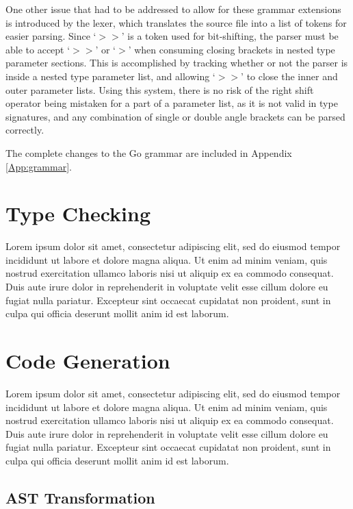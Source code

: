 \documentclass[letterpaper,twocolumn,10pt]{article}
\begin{document}
One other issue that had to be addressed to allow for these grammar extensions is introduced by the lexer, which translates the source file into a list of tokens for easier parsing. Since `\textbf{$>>$}' is a token used for bit-shifting, the parser must be able to accept `\textbf{$>>$}' or  `\textbf{$>$}' when consuming closing brackets in nested type parameter sections. This is accomplished by tracking whether or not the parser is inside a nested type parameter list, and allowing  `\textbf{$>>$}' to close the inner and outer parameter lists. Using this system, there is no risk of the right shift operator being mistaken for a part of a parameter list, as it is not valid in type signatures, and any combination of single or double angle brackets can be parsed correctly.

The complete changes to the Go grammar are included in Appendix \ref{App:grammar}.

\section{Type Checking} \label{type_checking}

Lorem ipsum dolor sit amet, consectetur adipiscing elit, sed do eiusmod tempor incididunt ut labore et dolore magna aliqua. Ut enim ad minim veniam, quis nostrud exercitation ullamco laboris nisi ut aliquip ex ea commodo consequat. Duis aute irure dolor in reprehenderit in voluptate velit esse cillum dolore eu fugiat nulla pariatur. Excepteur sint occaecat cupidatat non proident, sunt in culpa qui officia deserunt mollit anim id est laborum.

\section{Code Generation} \label{code_generation}

Lorem ipsum dolor sit amet, consectetur adipiscing elit, sed do eiusmod tempor incididunt ut labore et dolore magna aliqua. Ut enim ad minim veniam, quis nostrud exercitation ullamco laboris nisi ut aliquip ex ea commodo consequat. Duis aute irure dolor in reprehenderit in voluptate velit esse cillum dolore eu fugiat nulla pariatur. Excepteur sint occaecat cupidatat non proident, sunt in culpa qui officia deserunt mollit anim id est laborum.

\subsection{AST Transformation} \label{ast_transformation}
\end{document}
